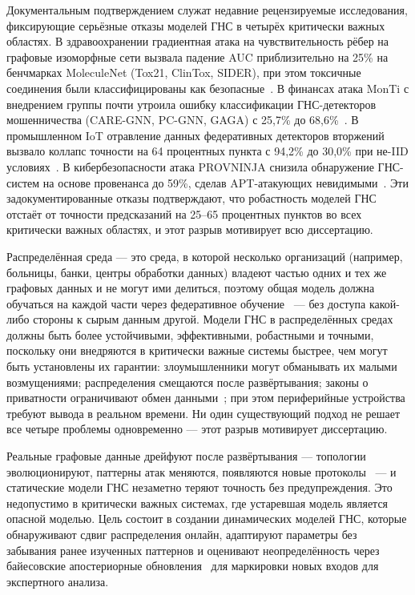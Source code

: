 Документальным подтверждением служат недавние рецензируемые исследования, фиксирующие серьёзные отказы моделей ГНС в четырёх критически важных областях. В здравоохранении градиентная атака на чувствительность рёбер на графовые изоморфные сети вызвала падение AUC приблизительно на 25\% на бенчмарках MoleculeNet (Tox21, ClinTox, SIDER), при этом токсичные соединения были классифицированы как безопасные~\cite{EdgeSensitivity2025}. В финансах атака MonTi с внедрением группы почти утроила ошибку классификации ГНС-детекторов мошенничества (CARE-GNN, PC-GNN, GAGA) с 25,7\% до 68,6\%~\cite{MonTi2025}. В промышленном IoT отравление данных федеративных детекторов вторжений вызвало коллапс точности на 64 процентных пункта с 94,2\% до 30,0\% при не-IID условиях~\cite{FerragPoisoning2023}. В кибербезопасности атака PROVNINJA снизила обнаружение ГНС-систем на основе провенанса до 59\%, сделав APT-атакующих невидимыми~\cite{PROVNINJA2023}. Эти задокументированные отказы подтверждают, что робастность моделей ГНС отстаёт от точности предсказаний на 25--65 процентных пунктов во всех критически важных областях, и этот разрыв мотивирует всю диссертацию.

Распределённая среда --- это среда, в которой несколько организаций (например, больницы, банки, центры обработки данных) владеют частью одних и тех же графовых данных и не могут ими делиться, поэтому общая модель должна обучаться на каждой части через федеративное обучение~\cite{McMahan2017,Blanchard2017,Kairouz2021,Konecny2016,Mothukuri2021} --- без доступа какой-либо стороны к сырым данным другой. Модели ГНС в распределённых средах должны быть более устойчивыми, эффективными, робастными и точными, поскольку они внедряются в критически важные системы быстрее, чем могут быть установлены их гарантии: злоумышленники могут обманывать их малыми возмущениями; распределения смещаются после развёртывания; законы о приватности ограничивают обмен данными~\cite{Dwork2006,Abadi2016,Dwork2014,Mironov2017}; при этом периферийные устройства требуют вывода в реальном времени. Ни один существующий подход не решает все четыре проблемы одновременно --- этот разрыв мотивирует диссертацию.

Реальные графовые данные дрейфуют после развёртывания --- топологии эволюционируют, паттерны атак меняются, появляются новые протоколы~\cite{Gama2014,Lu2019} --- и статические модели ГНС незаметно теряют точность без предупреждения. Это недопустимо в критически важных системах, где устаревшая модель является опасной моделью. Цель состоит в создании динамических моделей ГНС, которые обнаруживают сдвиг распределения онлайн, адаптируют параметры без забывания ранее изученных паттернов и оценивают неопределённость через байесовские апостериорные обновления~\cite{Gal2016,Kendall2017,Lakshminarayanan2017} для маркировки новых входов для экспертного анализа.

